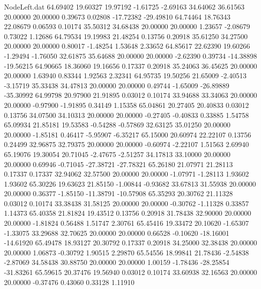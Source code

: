 \begin{filecontents}{NodeLeft.dat}
  64.69402   19.60327   19.97192    -1.61725   -2.69163   34.64062   36.61563   20.00000   20.00000    0.39673    0.02808  -17.72382  -29.49810
  64.74464   18.76343   22.08679     0.06593    0.10174   35.50312   34.68438   20.00000   20.00000    1.23657   -2.08679    0.73022    1.12686
  64.79534   19.19983   21.48254     0.13756    0.20918   35.61250   34.27500   20.00000   20.00000    0.80017   -1.48254    1.53648    2.33652
  64.85617   22.62390   19.60266    -1.29494   -1.76050   32.61875   35.64688   20.00000   20.00000   -2.62390    0.39734  -14.38898  -19.56215
  64.90665   18.36060   19.16656     0.17337    0.20918   35.24063   36.45625   20.00000   20.00000    1.63940    0.83344    1.92563    2.32341
  64.95735   19.50256   21.65009    -2.40513   -3.15719   35.33438   34.47813   20.00000   20.00000    0.49744   -1.65009  -26.89889  -35.30992
  64.99798   20.97900   21.91895     0.03012    0.10174   33.94688   33.34063   20.00000   20.00000   -0.97900   -1.91895    0.34149    1.15358
  65.04861   20.27405   20.40833     0.03012    0.13756   34.07500   34.10313   20.00000   20.00000   -0.27405   -0.40833    0.33885    1.54758
  65.09934   21.85181   19.53583    -0.54288   -0.57869   32.63125   35.01250   20.00000   20.00000   -1.85181    0.46417   -5.95907   -6.35217
  65.15000   20.60974   22.22107     0.13756    0.24499   32.96875   32.79375   20.00000   20.00000   -0.60974   -2.22107    1.51563    2.69940
  65.19076   19.30054   20.71045    -2.47675   -2.51257   34.17813   33.10000   20.00000   20.00000    0.69946   -0.71045  -27.38721  -27.78321
  65.26180   21.07971   21.28113     0.17337    0.17337   32.94062   32.57500   20.00000   20.00000   -1.07971   -1.28113    1.93602    1.93602
  65.30226   19.63623   21.85150    -1.00844   -0.93682   33.67813   31.55938   20.00000   20.00000    0.36377   -1.85150  -11.38791  -10.57908
  65.35293   20.30762   21.11328     0.03012    0.10174   33.38438   31.58125   20.00000   20.00000   -0.30762   -1.11328    0.33857    1.14373
  65.40358   21.81824   19.43512     0.13756    0.20918   31.78438   32.90000   20.00000   20.00000   -1.81824    0.56488    1.51747    2.30761
  65.45416   19.33472   20.10620    -1.65307   -1.33075   33.29688   32.70625   20.00000   20.00000    0.66528   -0.10620  -18.16001  -14.61920
  65.49478   18.93127   20.30792     0.17337    0.20918   34.25000   32.38438   20.00000   20.00000    1.06873   -0.30792    1.90515    2.29870
  65.54556   18.99841   21.78436    -2.54838   -2.87069   34.58438   30.88750   20.00000   20.00000    1.00159   -1.78436  -28.25854  -31.83261
  65.59615   20.37476   19.56940     0.03012    0.10174   33.60938   32.16563   20.00000   20.00000   -0.37476    0.43060    0.33128    1.11910

\end{filecontents}

